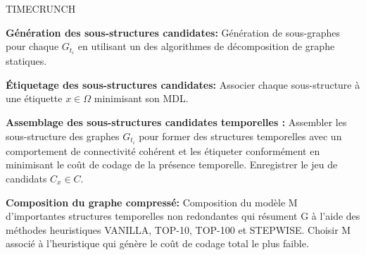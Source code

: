 			 \begin{algorithm}
					\caption{TIMECRUNCH}
				\begin{algorithmic} [1]
					\STATE \textbf{Génération des sous-structures candidates: }Génération de sous-graphes pour chaque $G_{t_{i}}$ en utilisant un des algorithmes de décomposition de graphe statiques.
					
					
					\STATE  \textbf{Étiquetage des sous-structures candidates: }Associer chaque sous-structure à une étiquette $x \in \Omega$ minimisant son MDL.
					
					\STATE  \textbf{Assemblage des sous-structures candidates temporelles :} Assembler les sous-structure des graphes $G_{t_{i}}$ pour former des structures temporelles avec un comportement de connectivité cohérent et les étiqueter conformément en minimisant le coût de codage de la présence temporelle. Enregistrer le jeu de candidats $C_{x} \in C $.
					
					\STATE \textbf{Composition du graphe compressé: }Composition du modèle M d'importantes structures temporelles non redondantes qui résument G à l'aide des méthodes heuristiques VANILLA, TOP-10, TOP-100 et STEPWISE. Choisir M associé à l'heuristique qui génère le coût de codage total le plus faible.
				\end{algorithmic}
			\end{algorithm}
			 
			 
			 
			 
			 
			 
			 
			 
			 
			 
			 
			 